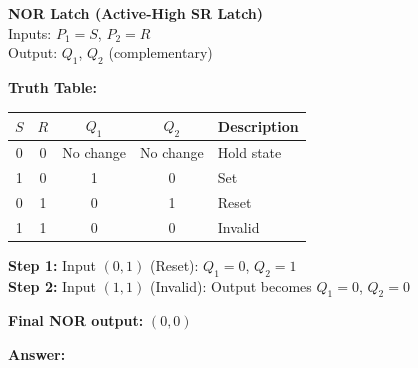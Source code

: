 \documentclass{article}
\begin{document}
\vspace{1em}
\textbf{NOR Latch (Active-High SR Latch)}\\
Inputs: $P_1 = S$, $P_2 = R$\\
Output: $Q_1$, $Q_2$ (complementary)

\textbf{Truth Table:}
\begin{center}
\begin{tabular}{|c|c|c|c|l|}
\hline
$S$ & $R$ & $Q_1$ & $Q_2$ & Description \\
\hline
0 & 0 & No change & No change & Hold state \\
1 & 0 & 1 & 0 & Set \\
0 & 1 & 0 & 1 & Reset \\
1 & 1 & 0 & 0 & Invalid \\
\hline
\end{tabular}
\end{center}
\textbf{Step 1:} Input $(0, 1)$ (Reset): $Q_1 = 0$, $Q_2 = 1$\\
\textbf{Step 2:} Input $(1, 1)$ (Invalid): Output becomes $Q_1 = 0$, $Q_2 = 0$

\vspace{0.5em}
\noindent\textbf{Final NOR output:} $(0, 0)$

\vspace{1em}
\noindent\textbf{Answer:} 
\end{document}
